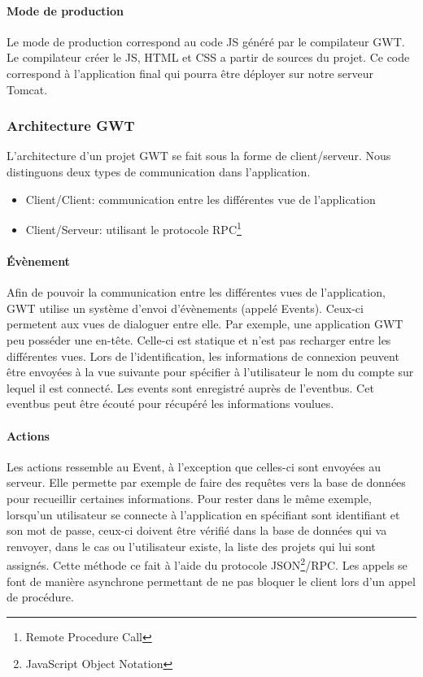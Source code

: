 \paragraph{Mode de production}
Le mode de production correspond au code JS généré par le compilateur GWT. Le compilateur créer le JS, HTML et CSS a partir de sources du projet. Ce code correspond à l'application final qui pourra être déployer sur notre serveur Tomcat.

\subsubsection{Architecture GWT}
L'architecture d'un projet GWT se fait sous la forme de client/serveur. Nous distinguons deux types de communication dans l'application.
\begin{itemize}
\item Client/Client: communication entre les différentes vue de l'application
\item Client/Serveur: utilisant le protocole RPC\footnote{Remote Procedure Call} 
\end{itemize}
\paragraph{Évènement}
Afin de pouvoir la communication entre les différentes vues de l'application, GWT utilise un système d'envoi d'évènements (appelé Events). Ceux-ci permetent aux vues de dialoguer entre elle.
Par exemple, une application GWT peu posséder une en-tête. Celle-ci est statique et n'est pas recharger entre les différentes vues. Lors de l'identification, les informations de connexion peuvent être envoyées à la vue suivante pour spécifier à l'utilisateur le nom du compte sur lequel il est connecté.
Les events sont enregistré auprès de l'eventbus. Cet eventbus peut être écouté pour récupéré les informations voulues.

\paragraph{Actions}
Les actions ressemble au Event, à l'exception que celles-ci sont envoyées au serveur. Elle permette par exemple de faire des requêtes vers la base de données pour recueillir certaines informations. Pour rester dans le même exemple, lorsqu'un utilisateur se connecte à l'application en spécifiant sont identifiant et son mot de passe, ceux-ci doivent être vérifié dans la base de données qui va renvoyer, dans le cas ou l'utilisateur existe, la liste des projets qui lui sont assignés. Cette méthode ce fait à l'aide du protocole JSON\footnote{JavaScript Object Notation}/RPC. Les appels se font de manière asynchrone permettant de ne pas bloquer le client lors d'un appel de procédure.
	
